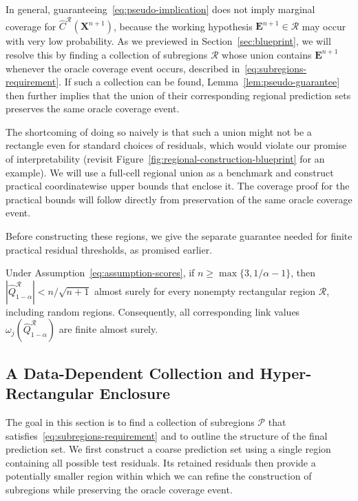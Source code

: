 In general, guaranteeing~\eqref{eq:pseudo-implication} does not imply marginal coverage for $\hat C^{\mathcal R}(\mathbf X^{n+1})$, because the working hypothesis $\mathbf E^{n+1}\in\mathcal R$ may occur with very low probability. 
As we previewed in Section~\ref{sec:blueprint}, we will resolve this by finding a collection of subregions $\mathcal R$ whose union contains $\mathbf E^{n+1}$ whenever the oracle coverage event occurs, described in~\eqref{eq:subregions-requirement}. If such a collection can be found, Lemma~\ref{lem:pseudo-guarantee} then further implies that the union of their corresponding regional prediction sets preserves the same oracle coverage event.

The shortcoming of doing so naively is that such a union might not be a rectangle even for standard choices of residuals, which would violate our promise of interpretability (revisit Figure~\ref{fig:regional-construction-blueprint} for an example). We will use a full-cell regional union as a benchmark and construct practical coordinatewise upper bounds that enclose it. The coverage proof for the practical bounds will follow directly from preservation of the same oracle coverage event.

Before constructing these regions, we give the separate guarantee needed for finite practical residual thresholds, as promised earlier.

\begin{lemma}\label{lem:regional-finite-bounds}
Under Assumption~\ref{eq:assumption-scores}, if
$n\geq\max\{3,1/\alpha-1\}$, then $|\hat Q^{\mathcal R}_{1-\alpha}|<n/\sqrt{n+1}$ almost surely
for every nonempty rectangular region $\mathcal R$, including random regions. Consequently, all corresponding link values
$\omega_j(\hat Q^{\mathcal R}_{1-\alpha})$ are finite almost surely.
\end{lemma}

\subsection{A Data-Dependent Collection and Hyper-Rectangular Enclosure}\label{sec:collection}

The goal in this section is to find a collection of subregions $\mathcal P$ that satisfies~\eqref{eq:subregions-requirement} and to outline the structure of the final prediction set. We first construct a coarse prediction set using a single region containing all possible test residuals. Its retained residuals then provide a potentially smaller region within which we can refine the construction of subregions while preserving the oracle coverage event.

